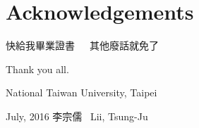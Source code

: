 
\chapter{Acknowledgements}

快給我畢業證書\ \ \ 其他廢話就免了

\begin{comment}
I should like to thank Prof. Yu-Fang Chen and Prof. Bow-Yaw Wang at Formal
Methods Laboratory in Academia Sinica.
Your guidance and instructions helped me gradually develop the whole framework
since I was a full-time research assistant in FM Lab.
Your solid training and teaching also forced me to establish my knowledge of
Software Verification and Formal Methods.
In particular, the opportunity and the experience you gave me to attend
international conferences surely is very enlightening though quite frightening.
In addition, I am specially grateful to and surprised by the assistance from
Dr. Ming-Hsien Tsai on the implementation.
Your efficiency and proficiency on software programming skills are simply
remarkable and incomparable.
Without your assistance, I am sure I cannot finish the implementation on my own,
let alone participating the competition.

I also learned a lot and pretty enjoyed my life in Software Testing Laboratory
in National Taiwan University.
Prof. Farn Wang is a great role model as a academic researcher.
His ambition on building an industrial strength software testing tool is
respectable.
The laboratory members and assistants are just adorable.
You guys inspired me in a unique way.
Even when we were both struggling for homeworks, reports, exams, and finally
the graduation, you guys still found many ways to relax and relief the tension
among the whole lab.
"Work Hard, Play Hard" is the spirit I learned from you.
You guys rock.

Finally, my appreciation to my parents and siblings is beyond words.
Thanks for your constant nagging on me about my physically and mentally
unhealthy lifestyle as well as trying to stop my 26-year-without-girlfriend
achievement.
Your concerns and considerations kept reminding me that,
even if I might fail so hard and be so frustrated, I still can go home,
where I can relax and recover until the next challenge comes.

\end{comment}

\vspace{8mm}

\noindent
Thank you all.

\vspace{8mm}

\noindent
National Taiwan University, Taipei

\noindent
July, 2016 \hfill 李宗儒 \ Lii, Tsung-Ju

